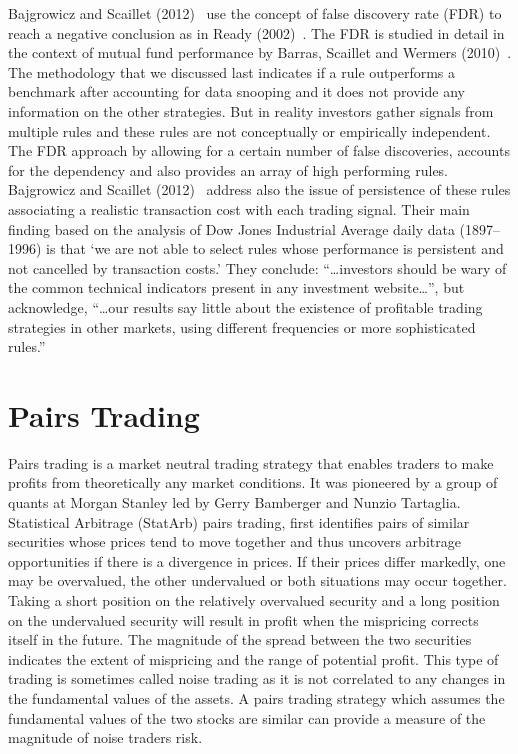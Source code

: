 Bajgrowicz and Scaillet (2012)~\cite{bajgrowicz2012technical} use the concept of false discovery rate (FDR) to reach a negative conclusion as in Ready (2002)~\cite{ready}. The FDR is studied in detail in the context of mutual fund performance by Barras, Scaillet and Wermers (2010)~\cite{barras2010false}. The methodology that we discussed last indicates if a rule outperforms a benchmark after accounting for data snooping and it does not provide any information on the other strategies. But in reality investors gather signals from multiple rules and these rules are not conceptually or empirically independent. The FDR approach by allowing for a certain number of false discoveries, accounts for the dependency and also provides an array of high performing rules. Bajgrowicz and Scaillet (2012)~\cite{bajgrowicz2012technical} address also the issue of persistence of these rules associating a realistic transaction cost with each trading signal. Their main finding based on the analysis of Dow Jones Industrial Average daily data (1897--1996) is that `we are not able to select rules whose performance is persistent and not cancelled by transaction costs.' They conclude: ``\dots investors should be wary of the common technical indicators present in any investment website\dots'', but acknowledge, ``\dots our results say little about the existence of profitable trading strategies in other markets, using different frequencies or more sophisticated rules.''



\section{Pairs Trading}

Pairs trading is a market neutral trading strategy that enables traders to make profits from theoretically any market conditions. It was pioneered by a group of quants at Morgan Stanley led by Gerry Bamberger and Nunzio Tartaglia. Statistical Arbitrage (StatArb) pairs trading, first identifies pairs of similar securities whose prices tend to move together and thus uncovers arbitrage opportunities if there is a divergence in prices. If their prices differ markedly, one may be overvalued, the other undervalued or both situations may occur together. Taking a short position on the relatively overvalued security and a long position on the undervalued security will result in profit when the mispricing corrects itself in the future. The magnitude of the spread between the two securities indicates the extent of mispricing and the range of potential profit. This type of trading is sometimes called noise trading as it is not correlated to any changes in the fundamental values of the assets. A pairs trading strategy which assumes the fundamental values of the two stocks are similar can provide a measure of the magnitude of noise traders risk.


